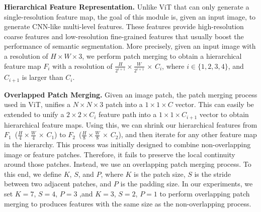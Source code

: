 \textbf{Hierarchical Feature Representation.}
Unlike ViT that can only generate a single-resolution feature map, the goal of this module is, given an input image, to generate CNN-like multi-level features. These features provide high-resolution coarse features and low-resolution fine-grained features that usually boost the performance of semantic segmentation. More precisely, given an input image with a resolution of $H \times W \times 3$, we perform patch merging to obtain a hierarchical feature map $F_i$ with a resolution of $\frac{H}{2^{i+1}} \times \frac{W}{2^{i+1}}$ $\times$ $C_i$, where $i \in \{1,2,3,4\}$, and $C_{i+1}$ is larger than $C_i$.


\textbf{Overlapped Patch Merging.} 
Given an image patch, the patch merging process used in ViT, unifies a $N \times N \times 3$ patch into a $1 \times 1 \times C$ vector. This can easily be extended to unify a $2 \times 2 \times C_i$ feature path into a $1 \times 1 \times C_{i+1}$ vector to obtain hierarchical feature maps. Using this, we can shrink our hierarchical features from $F_1$~($\frac{H}{4} \times \frac{W}{4}$ $\times$ $C_1$) to $F_2$~($\frac{H}{8} \times \frac{W}{8}$ $\times$ $C_2$), and then iterate for any other feature map in the hierarchy. This process was initially designed to combine non-overlapping image or feature patches. Therefore, it fails to preserve the local continuity around those patches. Instead, we use an overlapping patch merging process. To this end, we define $K$, $S$, and $P$, where $K$ is the patch size, $S$ is the stride between two adjacent patches, and $P$ is the padding size. In our experiments, we set $K=7$, $S=4$, $P=3$ ,and $K=3$, $S=2$, $P=1$ to perform overlapping patch merging to produces features with the same size as the non-overlapping process.




